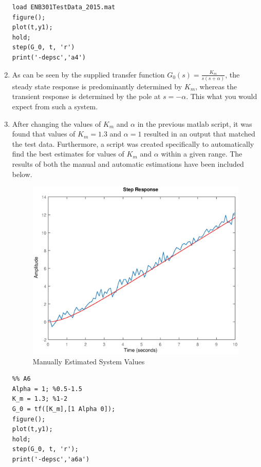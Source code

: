 \documentclass[11pt,a4paper]{article}
\begin{document}
\begin{enumerate}
\begin{lstlisting}
load ENB301TestData_2015.mat
figure();
plot(t,y1);
hold;
step(G_0, t, 'r')
print('-depsc','a4')
	\end{lstlisting}
  
  
  
  
  
    \item As can be seen by the supplied transfer function $G_0(s) = \frac{K_m}{s(s+\alpha)}$, the steady state response is predominantly determined by $K_m$, whereas the transient response is determined by the pole at $s = -\alpha$. This what you would expect from such a system. 
    
    
    
    
    \pagebreak
    \item After changing the values of $K_m$ and $\alpha$ in the previous matlab script, it was found that values of $K_m = 1.3$ and $\alpha = 1$ resulted in an output that matched the test data. Furthermore, a script was created specifically to automatically find the best estimates for values of $K_m$ and $\alpha$ within a given range. The results of both the manual and automatic estimations have been included below. 
    \begin{figure}[H]
	\centering
	\includegraphics[width=.8\textwidth]{PreLach/a6a.eps}
	\caption{\label{fig:manest}Manually Estimated System Values}
	\end{figure}
    \begin{lstlisting}
%% A6
Alpha = 1; %0.5-1.5
K_m = 1.3; %1-2
G_0 = tf([K_m],[1 Alpha 0]);
figure();
plot(t,y1);
hold;
step(G_0, t, 'r');
print('-depsc','a6a')
	\end{lstlisting}
    

\end{enumerate}
\end{document}
